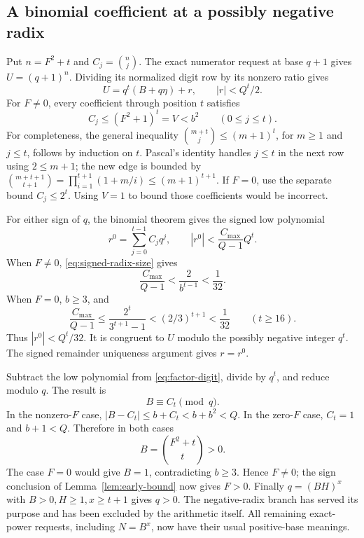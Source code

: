 \subsection{A binomial coefficient at a possibly negative radix}

Put \(n=F^2+t\) and \(C_j=\binom{n}{j}\). The exact numerator request
at base \(q+1\) gives \(U=(q+1)^n\). Dividing its normalized digit
row by its nonzero ratio gives
\begin{equation}\label{eq:factor-digit}
 U=q^t(B+q\eta)+r,\qquad |r|<Q^t/2.
\end{equation}
For \(F\ne0\), every coefficient through position \(t\) satisfies
\begin{equation}\label{eq:coeff}
 C_j\le(F^2+1)^t=V<b^2\qquad(0\le j\le t).
\end{equation}
For completeness, the general inequality
\(\binom{m+t}{j}\le(m+1)^t\), for \(m\ge1\) and \(j\le t\),
follows by induction on \(t\). Pascal's identity handles
\(j\le t\) in the next row using \(2\le m+1\); the new edge is
bounded by
\(\binom{m+t+1}{t+1}=\prod_{i=1}^{t+1}(1+m/i)\le(m+1)^{t+1}\).
If \(F=0\), use the separate bound \(C_j\le2^t\).
Using \(V=1\) to bound those coefficients would be incorrect.

For either sign of \(q\), the binomial theorem gives the signed
low polynomial
\[
 r^0=\sum_{j=0}^{t-1}C_jq^j,\qquad
 |r^0|<\frac{C_{\max}}{Q-1}Q^t.
\]
When \(F\ne0\), \eqref{eq:signed-radix-size} gives
\[
 \frac{C_{\max}}{Q-1}
 <\frac{2}{b^{t-1}}<\frac1{32}.
\]
When \(F=0\), \(b\ge3\), and
\[
 \frac{C_{\max}}{Q-1}
 \le\frac{2^t}{3^{t+1}-1}
 <(2/3)^{t+1}<\frac1{32}
 \qquad(t\ge16).
\]
Thus \(|r^0|<Q^t/32\). It is congruent to \(U\) modulo
the possibly negative integer \(q^t\). The signed remainder
uniqueness argument gives \(r=r^0\).

Subtract the low polynomial from \eqref{eq:factor-digit},
divide by \(q^t\), and reduce modulo \(q\). The result is
\[
 B\equiv C_t\pmod q.
\]
In the nonzero-\(F\) case, \(|B-C_t|\le b+C_t<b+b^2<Q\).
In the zero-\(F\) case, \(C_t=1\) and \(b+1<Q\).
Therefore in both cases
\begin{equation}\label{eq:B-exact}
 B=\binom{F^2+t}{t}>0.
\end{equation}
The case \(F=0\) would give \(B=1\), contradicting \(b\ge3\).
Hence \(F\ne0\); the sign conclusion of
Lemma~\ref{lem:early-bound} now gives \(F>0\).
Finally \(q=(BH)^x\) with \(B>0,H\ge1,x\ge t+1\) gives \(q>0\).
The negative-radix branch has served its purpose and has been excluded
by the arithmetic itself. All remaining exact-power requests, including
\(N=B^x\), now have their usual positive-base meanings.


